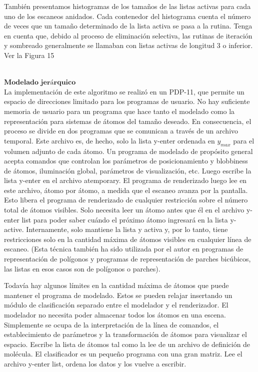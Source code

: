 También presentamos histogramas de los tamaños de las listas activas para cada uno de los escaneos anidados. Cada contenedor del histograma cuenta el número de veces que un tamaño determinado de la lista activa se pasa a la rutina. Tenga en cuenta que, debido al proceso de eliminación selectiva, las rutinas de iteración y sombreado generalmente se llamaban con listas activas de longitud 3 o inferior. Ver la Figura 15


${ }$\\
$\textbf{Modelado jerárquico}$
${ }$\\

La implementación de este algoritmo se realizó en un PDP-11, que permite un espacio de direcciones limitado para los programas de usuario. No hay suficiente memoria de usuario para un programa que hace tanto el modelado como la representación para sistemas de átomos del tamaño deseado. En consecuencia, el proceso se divide en dos programas que se comunican a través de un archivo temporal. Este archivo es, de hecho, solo la lista y-enter ordenada en $y_{max}$ para el volumen adjunto de cada átomo. Un programa de modelado de propósito general acepta comandos que controlan los parámetros de posicionamiento y blobbiness de átomos, iluminación global, parámetros de visualización, etc. Luego escribe la lista y-enter en el archivo atemporary. El programa de renderizado luego lee en este archivo, átomo por átomo, a medida que el escaneo avanza por la pantalla. Esto libera el programa de renderizado de cualquier restricción sobre el número total de átomos visibles. Solo necesita leer un átomo antes que él en el archivo y-enter list para poder saber cuándo el próximo átomo ingresará en la lista y-active. Internamente, solo mantiene la lista y activa y, por lo tanto, tiene restricciones solo en la cantidad máxima de átomos visibles en cualquier línea de escaneo. (Esta técnica también ha sido utilizada por el autor en programas de representación de polígonos y programas de representación de parches bicúbicos, las listas en esos casos son de polígonos o parches).

Todavía hay algunos límites en la cantidad máxima de átomos que puede mantener el programa de modelado. Estos se pueden relajar insertando un módulo de clasificación separado entre el modelador y el renderizador. El modelador no necesita poder almacenar todos los átomos en una escena. Simplemente se ocupa de la interpretación de la línea de comandos, el establecimiento de parámetros y la transformación de átomos para visualizar el espacio. Escribe la lista de átomos tal como la lee de un archivo de definición de molécula. El clasificador es un pequeño programa con una gran matriz. Lee el archivo y-enter list, ordena los datos y los vuelve a escribir.

